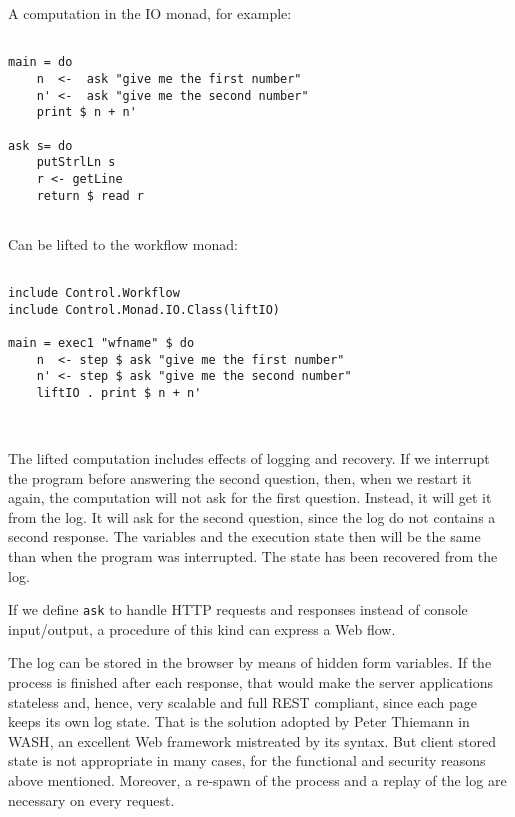 \documentclass{tmr}
\begin{document}
A computation in the IO monad, for example: 
 
{\tt 
 
\begin{verbatim} 
 
main = do 
    n  <-  ask "give me the first number" 
    n' <-  ask "give me the second number" 
    print $ n + n' 
 
ask s= do 
    putStrlLn s 
    r <- getLine 
    return $ read r 
 
\end{verbatim} 
 
} 
 
Can be lifted to the workflow monad: 
 
{\tt 
 
\begin{verbatim} 
 
include Control.Workflow 
include Control.Monad.IO.Class(liftIO) 
 
main = exec1 "wfname" $ do 
    n  <- step $ ask "give me the first number" 
    n' <- step $ ask "give me the second number" 
    liftIO . print $ n + n' 
 
 
\end{verbatim} 
 
} 
 
The lifted computation includes effects of logging and recovery. If we interrupt the program before answering the second question, then, when we restart it again, the computation will not ask for the first question. Instead, it will get it from the log. It will ask for the second question, since the log do not contains a second response. The variables and the execution state then will be the same than when the program was interrupted. The state has been recovered from the log. 
 
If we define {\tt ask} to handle HTTP requests and responses instead of console input/output, a procedure of this kind can express a Web flow. 
 
The log can be stored in the browser by means of hidden form 
variables. If the process is finished after each response, that would make the server applications stateless and, hence, very scalable and full REST compliant, since each page keeps its own log state. That is the solution adopted by Peter Thiemann in WASH\cite{auth:wash}, an excellent Web framework mistreated by its syntax. But client stored state is not appropriate in many cases, for the functional and security reasons above mentioned. Moreover, a re-spawn of the process and a replay of the log are necessary on every request. 
 
\end{document}
